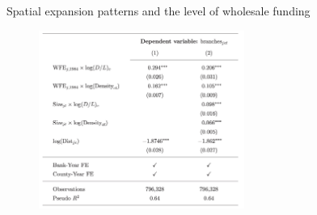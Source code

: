 \documentclass[notes,10pt, aspectratio=169]{beamer}
\newenvironment{wideitemize}{\itemize\addtolength{\itemsep}{10pt}}{\enditemize}
\begin{document}
    
        \begin{frame}{Spatial expansion patterns and the level of wholesale funding         \hyperlink{mismatch_sorting}{}}\label{mismatch_sorting4}
    
                
        
                
        
            \begin{figure}
                \centering
                \includegraphics[width=0.6\textwidth]{imgs/tab6.png}
                \label{fig:my_label}
            \end{figure}
            
            \end{frame}
        
\end{document}
